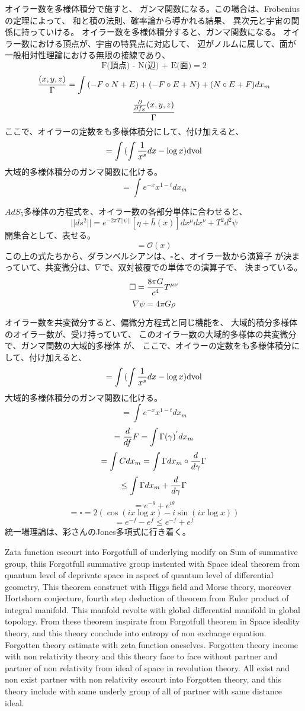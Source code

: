\documentclass{jsarticle}
\begin{document}
        オイラー数を多様体積分で施すと、
   ガンマ関数になる。この場合は、Frobeniusの定理によって、
   和と積の法則、確率論から導かれる結果、
   異次元と宇宙の関係に持っていける。
   オイラー数を多様体積分すると、ガンマ関数になる。
   オイラー数における頂点が、宇宙の特異点に対応して、
   辺がノルムに属して、面が一般相対性理論における無限の接線であり、
   $$ \text{F(頂点) - N(辺) + E(面)} = 2 $$
   $$ {(x,y,z) \over \Gamma} = \int{(- F\circ N + E)} + 
   (-F\circ E + N) + (N\circ E + F)dx_m $$
   $$ {{{\partial \over \partial f_S}(x,y,z)} \over {\Gamma}} $$
   ここで、オイラーの定数をも多様体積分にして、付け加えると、
   $$ = \int{({\int {1 \over x^s}dx} - \log x)}\mathrm{dvol} $$
   大域的多様体積分のガンマ関数に化ける。
   $$ = \int e^{-x}x^{1 - t}dx_m $$

   $AdS_5$多様体の方程式を、オイラー数の各部分単体に合わせると、
   $$ ||ds^2|| = e^{-2\pi T||\psi||}[\eta + \bar{h}(x)]dx^{\mu}dx^{\nu} 
   + T^2d^2 \psi $$
   開集合として、表せる。
   $$ = \mathcal{O}(x) $$
   この上の式たちから、ダランベルシアンは、$\square$と、オイラー数から演算子
   が決まっていて、共変微分は、$\nabla$で、双対被覆での単体での演算子で、
   決まっている。
   $$ \square = {{8 \pi G} \over c^4} T^{\mu\nu} $$
   $$ \nabla \psi = 4 \pi G \rho $$

   オイラー数を共変微分すると、偏微分方程式と同じ機能を、
   大域的積分多様体のオイラー数が、受け持っていて、
   このオイラー数の大域的多様体の共変微分で、ガンマ関数の大域的多様体
   が、
   ここで、オイラーの定数をも多様体積分にして、付け加えると、
   $$ = \int{({\int {1 \over x^s}dx} - \log x)}\mathrm{dvol} $$
   大域的多様体積分のガンマ関数に化ける。
   $$ = \int e^{-x}x^{1 - t}dx_m $$
   $$ = {d \over d f}F = \int \Gamma(\gamma)^{'}dx_m $$
   $$ = \int C dx_m = \int \Gamma dx_m \circ {d \over d \gamma}\Gamma $$
   $$ \le \int \Gamma dx_m + {d \over d \gamma}\Gamma $$
   $$ = e^{- \theta} + e^{i \theta} $$
   $$ = \square = 2(\cos (i x \log x) - i \sin (i x \log x))$$
   $$ = e^{-f} - e^{f} \le e^{-f} + e^{f} $$
   統一場理論は、彩さんのJones多項式に行き着く。

   Zata function escourt into Forgotfull of underlying modify on Sum
   of summative group, thiis Forgotfull summative group instented with
   Space ideal theorem from quantum level of deprivate space in aspect
   of quantum level of differential geometry,
   This theorem construct with Higgs field and Morse theory, moreover
   Hortshorn conjecture, fourth step deduction of theorem from 
   Euler product of integral manifold.
   This manfold revolte with global differential manifold in global topology.
   From these theorem inspirate from Forgotfull theorem in Space ideality
   theory, and this theory conclude into entropy of non exchange equation.
   Forgotten theory estimate with zeta function oneselves.
   Forgotten theory income with non relativity theory and this theory
   face to face without partner and partner of non relativity from
   ideal of space in revolution theory.
   All exist and non exist partner with non relativity escourt into 
   Forgotten theory, and this theory include with same underly group
   of all of partner with same distance ideal.
\end{document}
